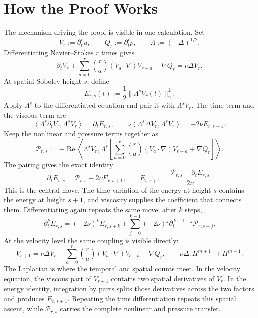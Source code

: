 \begingroup
\small
\setlength{\parindent}{0pt}
\setlength{\parskip}{0.55\baselineskip}
\setlength{\abovedisplayskip}{8pt plus 2pt minus 2pt}
\setlength{\belowdisplayskip}{8pt plus 2pt minus 2pt}
\setlength{\jot}{4pt}

\section*{How the Proof Works}

The mechanism driving the proof is visible in one calculation.  Set
\[
V_r:=\partial_t^r u,
\qquad
Q_r:=\partial_t^r p,
\qquad
\Lambda:=(-\Delta)^{1/2}.
\]
Differentiating Navier--Stokes \(r\) times gives
\[
\partial_tV_r
+\sum_{a=0}^{r}\binom ra(V_a\!\cdot\nabla)V_{r-a}
+\nabla Q_r
=\nu\Delta V_r.
\]
At spatial Sobolev height \(s\), define
\[
E_{r,s}(t):=\frac12\|\Lambda^sV_r(t)\|_2^2.
\]
Apply \(\Lambda^s\) to the differentiated equation and pair it with
\(\Lambda^sV_r\).  The time term and the viscous term are
\[
\left\langle\Lambda^s\partial_tV_r,\Lambda^sV_r\right\rangle
=\partial_tE_{r,s},
\qquad
\nu\left\langle\Lambda^s\Delta V_r,\Lambda^sV_r\right\rangle
=-2\nu E_{r,s+1}.
\]
Keep the nonlinear and pressure terms together as
\[
\mathcal P_{r,s}
:=-\operatorname{Re}
\left\langle
\Lambda^sV_r,
\Lambda^s\!\left[
\sum_{a=0}^{r}\binom ra(V_a\!\cdot\nabla)V_{r-a}
+\nabla Q_r
\right]
\right\rangle.
\]
The pairing gives the exact identity
\[
\boxed{
\partial_tE_{r,s}=\mathcal P_{r,s}-2\nu E_{r,s+1},
\qquad
E_{r,s+1}
=\frac{\mathcal P_{r,s}-\partial_tE_{r,s}}{2\nu}.
}
\]
This is the central move.  The time variation of the energy at height \(s\)
contains the energy at height \(s+1\), and viscosity supplies the coefficient
that connects them.  Differentiating again repeats the same move; after \(k\)
steps,
\[
\boxed{
\partial_t^kE_{r,s}
=(-2\nu)^kE_{r,s+k}
+\sum_{j=0}^{k-1}(-2\nu)^j
\partial_t^{\,k-1-j}\mathcal P_{r,s+j}.
}
\]
At the velocity level the same coupling is visible directly:
\[
V_{r+1}
=\nu\Delta V_r
-\sum_{a=0}^{r}\binom ra(V_a\!\cdot\nabla)V_{r-a}
-\nabla Q_r,
\qquad
\nu\Delta:H^{m+1}\longrightarrow H^{m-1}.
\]
The Laplacian is where the temporal and spatial counts meet.  In the velocity
equation, the viscous part of \(V_{r+1}\) contains two spatial derivatives of
\(V_r\).  In the energy identity, integration by parts splits those
derivatives across the two factors and produces \(E_{r,s+1}\).  Repeating the
time differentiation repeats this spatial ascent, while \(\mathcal P_{r,s}\)
carries the complete nonlinear and pressure transfer.

